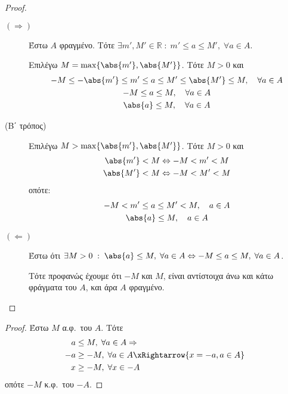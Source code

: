 \documentclass[main.tex]{subfiles}
\begin{document}
\begin{proof}
\item {}
  \begin{description}
    \item [$ (\Rightarrow) $] Έστω $A$ φραγμένο. Τότε 
      $ \exists m',M' \in \mathbb{R} \; : \; m' \leq a \leq M', \; 
      \forall a \in A $.

      Επιλέγω $ M = \max \{ \abs{m'}, \abs{M'} \} $. Τότε $ M >0 $ και 
      \begin{gather*}
        -M \leq - \abs{m'} \leq m' \leq a \leq M' \leq \abs{M'} 
        \leq M, \quad \forall a \in A \\
        -M \leq a \leq M, \quad \forall a \in A \\
        \abs{a} \leq M, \quad \forall a \in A
      \end{gather*}

    \item [(Β΄ τρόπος)]
      Επιλέγω $ M > \max \{ \abs{m'}, \abs{M'} \} $. Τότε $ M >0 $ και 
      \begin{gather*}
        \abs{m'} < M \Leftrightarrow - M < m' < M \\
        \abs{M'} < M \Leftrightarrow -M < M' < M 
      \end{gather*}
      οπότε: 
      \begin{gather*}
        -M < m' \leq a \leq M' < M, \quad a \in A \\
        \abs{a} \leq M, \quad a \in A
      \end{gather*}


    \item [$ (\Leftarrow) $]
      Έστω ότι $ \exists M>0 \; : \; \abs{a} \leq M, \; \forall a \in 
      A \Leftrightarrow -M \leq a \leq M, \; \forall a \in A$. 

      Τότε προφανώς έχουμε ότι $-M $ και $ M $, 
      είναι αντίστοιχα άνω και κάτω φράγματα του $A$, και άρα $A$ 
      φραγμένο.
  \end{description} 
\end{proof}


\begin{proof}
  Έστω $M$ α.φ.\ του $A$. Τότε 
  \begin{align*}
    a &\leq M, \; \forall a \in A \Rightarrow  \\
    -a &\geq -M, \; \forall a \in A \xRightarrow{x= -a, a \in A} \\
    x &\geq -M, \; \forall x \in -A
  \end{align*}
  οπότε $ -M $  κ.φ.\ του $ -A $.
\end{proof}
\end{document}
